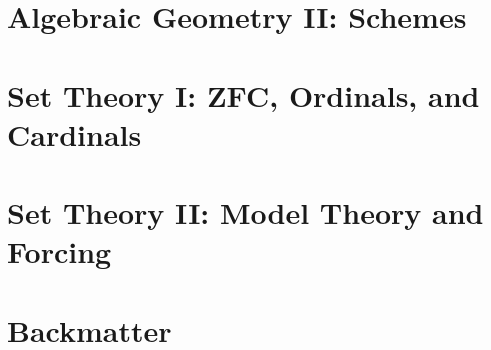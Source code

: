 \documentclass[11pt,numbers=noenddot]{scrreprt}
\begin{document}
\part{Algebraic Geometry II: Schemes}

\part{Set Theory I: ZFC, Ordinals, and Cardinals}





\part{Set Theory II: Model Theory and Forcing}




\part{Backmatter}
\appendix



\clearpage
\printbibliography



%
%
\end{document}
